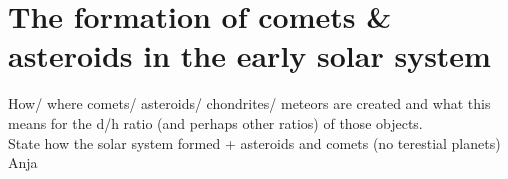 \documentclass[11pt]{article}
\begin{document}



\newpage				%
\setcounter{page}{0}
\thispagestyle{empty}	%



\newpage				%
\renewcommand{\contentsname}{Table of Contents}
\tableofcontents		%
\thispagestyle{empty}	%


\newpage				%



\newpage
\section{The formation of comets \& asteroids in the early solar system}
How/ where comets/ asteroids/ chondrites/ meteors are created and what this means for the d/h ratio (and perhaps other ratios) of those objects.\\
State how the solar system formed + asteroids and comets (no terestial planets)\\
Anja


\newpage



\newpage
\end{document}

